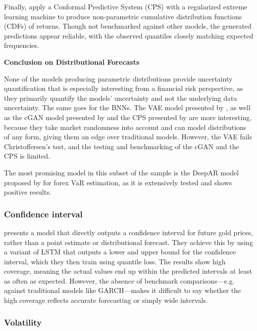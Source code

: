 Finally, \textcite{wang2020fastconformal} apply a Conformal Predictive System (CPS) with a regularized extreme learning machine to produce non-parametric cumulative distribution functions (CDFs) of returns. Though not benchmarked against other models, the generated predictions appear reliable, with the observed quantiles closely matching expected frequencies.

\textbf{Conclusion on Distributional Forecasts}

None of the models producing parametric distributions provide uncertainty quantification that is especially interesting from a financial risk perspective, as they primarily quantify the models' uncertainty and not the underlying data uncertainty. The same goes for the BNNs. The VAE model presented by \textcite{arian2022encoded}, as well as the cGAN model presented by \textcite{Almeida2024RiskForecasting} and the CPS presented by \textcite{wang2020fastconformal} are more interesting, because they take market randomness into account and can model distributions of any form, giving them an edge over traditional models. However, the VAE fails Christoffersen's test, and the testing and benchmarking of the cGAN and the CPS is limited.

The most promising model in this subset of the sample is the DeepAR model proposed by \textcite{Fatouros2023DeepVaR} for forex VaR estimation, as it is extensively tested and shows positive results.


\subsubsection{Confidence interval}

\textcite{Wang2024GoldForecasting} presents a model that directly outputs a confidence interval for future gold prices, rather than a point estimate or distributional forecast. They achieve this by using a variant of LSTM that outputs a lower and upper bound for the confidence interval, which they then train using quantile loss. The results show high coverage, meaning the actual values end up within the predicted intervals at least as often as expected. However, the absence of benchmark comparisons—e.g. against traditional models like GARCH—makes it difficult to say whether the high coverage reflects accurate forecasting or simply wide intervals.



\subsubsection{Volatility}

